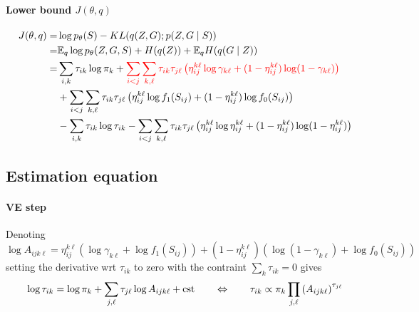 \paragraph{Lower bound $J(\theta, q)$}
\begin{align} \label{eq:lowerBound}
 J(\theta, q) 
 = & \log p_\theta(S) - KL(q(Z, G) ; p(Z, G \mid S)) \nonumber \\
 = & \mathbb E_q \log p_\theta(Z, G, S) + H(q(Z))  + \mathbb E_q H(q(G \mid Z)) \\ 
 = & \sum_{i, k} \tau_{ik} \log \pi_k 
 + \textcolor{red}{\sum_{i < j} \sum_{k, \ell} \tau_{ik} \tau_{j\ell} \left(\eta^{k\ell}_{ij} \log \gamma_{k\ell} + (1 - \eta^{k\ell}_{ij}) \log (1 - \gamma_{k\ell})\right)} \nonumber \\
 & + \sum_{i < j} \sum_{k, \ell} \tau_{ik} \tau_{j\ell} \left(\eta^{k\ell}_{ij} \log f_1(S_{ij}) + (1 - \eta^{k\ell}_{ij}) \log f_0(S_{ij})\right) \nonumber \\
 & - \sum_{i, k} \tau_{ik} \log \tau_{ik} - \sum_{i< j} \sum_{k, \ell} \tau_{ik} \tau_{j\ell} \left( \eta^{k\ell}_{ij} \log \eta^{k\ell}_{ij} + (1 - \eta^{k\ell}_{ij}) \log (1 - \eta^{k\ell}_{ij}) \right)
\end{align}

\subsection{Estimation equation}

\paragraph{VE step}
Denoting 
$$
\log A_{ijk\ell} = \eta^{k\ell}_{ij} \left(\log \gamma_{k\ell} + \log f_1(S_{ij})\right) + (1 - \eta^{k\ell}_{ij}) \left(\log (1 - \gamma_{k\ell}) + \log f_0(S_{ij}) \right)
$$
setting the derivative wrt $\tau_{ik}$ to zero with the contraint $\sum_{k} \tau_{ik} = 0$ gives
$$
\log \tau_{ik} = \log \pi_k + \sum_{j, \ell} \tau_{j\ell} \log A_{ijk\ell} + \text{cst}
\qquad \Leftrightarrow \qquad
\tau_{ik} \propto \pi_k \prod_{j, \ell} \left(A_{ijk\ell}\right)^{\tau_{j\ell}}
$$


